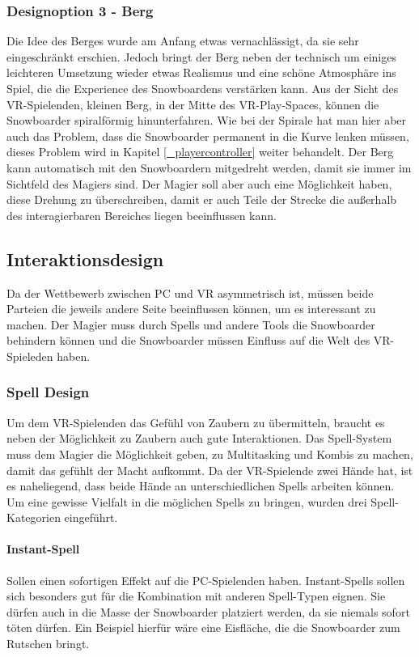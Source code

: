 \subsubsection{Designoption 3 - Berg}
Die Idee des Berges wurde am Anfang etwas vernachlässigt, da sie sehr eingeschränkt erschien. Jedoch bringt der Berg neben der technisch um einiges leichteren Umsetzung wieder etwas Realismus und eine schöne Atmosphäre ins Spiel, die die Experience des Snowboardens verstärken kann. Aus der Sicht des VR-Spielenden, kleinen Berg, in der Mitte des VR-Play-Spaces, können die Snowboarder spiralförmig hinunterfahren. Wie bei der Spirale hat man hier aber auch das Problem, dass die Snowboarder permanent in die Kurve lenken müssen, dieses Problem wird in Kapitel \ref{_playercontroller} weiter behandelt. Der Berg kann automatisch mit den Snowboardern mitgedreht werden, damit sie immer im Sichtfeld des Magiers sind. Der Magier soll aber auch eine Möglichkeit haben, diese Drehung zu überschreiben, damit er auch Teile der Strecke die außerhalb des interagierbaren Bereiches liegen beeinflussen kann.

\subsection{Interaktionsdesign}
Da der Wettbewerb zwischen PC und VR asymmetrisch ist, müssen beide Parteien die jeweils andere Seite beeinflussen können, um es interessant zu machen. Der Magier muss durch Spells und andere Tools die Snowboarder behindern können und die Snowboarder müssen Einfluss auf die Welt des VR-Spieleden haben.

\subsubsection{Spell Design\label{_spell_design}}
Um dem VR-Spielenden das Gefühl von Zaubern zu übermitteln, braucht es neben der Möglichkeit zu Zaubern auch gute Interaktionen. Das Spell-System muss dem Magier die Möglichkeit geben, zu Multitasking und Kombis zu machen, damit das gefühlt der Macht aufkommt. Da der VR-Spielende zwei Hände hat, ist es naheliegend, dass beide Hände an unterschiedlichen Spells arbeiten können. Um eine gewisse Vielfalt in die möglichen Spells zu bringen, wurden drei Spell-Kategorien eingeführt.

\paragraph{Instant-Spell}
Sollen einen sofortigen Effekt auf die PC-Spielenden haben. Instant-Spells sollen sich besonders gut für die Kombination mit anderen Spell-Typen eignen. Sie dürfen auch in die Masse der Snowboarder platziert werden, da sie niemals sofort töten dürfen. Ein Beispiel hierfür wäre eine Eisfläche, die die Snowboarder zum Rutschen bringt.


